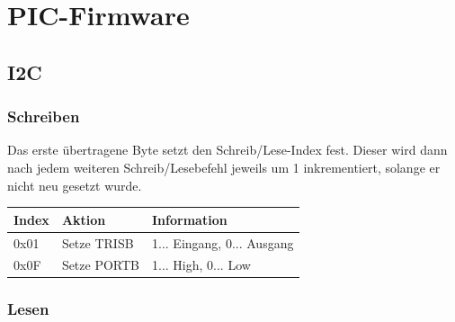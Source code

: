 \documentclass[a4paper,10pt]{article}
\begin{document}
\newpage

\section{PIC-Firmware}

\subsection{I2C}

\subsubsection{Schreiben}

Das erste übertragene Byte setzt den Schreib/Lese-Index fest. Dieser wird dann nach jedem weiteren Schreib/Lesebefehl jeweils um 1 inkrementiert, solange er nicht neu gesetzt wurde.

\begin{center}
    \begin{tabular}{| l | l | l |}
    \hline
    Index 	& Aktion 	& Information \\ \hline
    0x01 	& Setze TRISB 	& 1... Eingang, 0... Ausgang \\ \hline
    0x0F 	& Setze PORTB 	& 1... High, 0... Low \\ \hline
    \end{tabular}
\end{center}

\subsubsection{Lesen}
\end{document}
